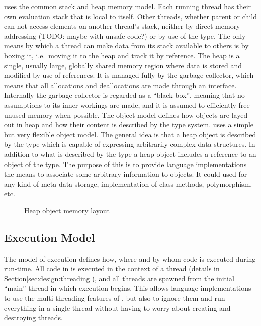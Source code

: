\thename{} uses the common stack and heap memory model. Each running thread has
their own evaluation stack that is local to itself. Other threads, whether
parent or child can not access elements on another thread's stack, neither by
direct memory addressing (TODO: maybe with unsafe code?) or by use of the
 type. The only means by which a thread can make data from
its stack available to others is by boxing it, i.e.~moving it to the heap and
track it by reference. The heap is a single, usually large, globally shared
memory region where data is stored and modified by use of references. It is
managed fully by the garbage collector, which means that all allocations and
deallocations are made through an interface. Internally the garbage collector is
regarded as a ``black box'', meaning that no assumptions to its inner workings
are made, and it is assumed to efficiently free unused memory when possible.
The object model defines how objects are layed out in heap and how their content
is described by the type system. \thename{} uses a simple but very flexible
object model. The general idea is that a heap object is described by the
 type which is capable of expressing arbitrarily complex data
structures. In addition to what is described by the type a heap object includes
a reference to an object of the  type. The purpose of this is to
provide language implementations the means to associate some arbitrary
information to objects. It could used for any kind of meta data storage,
implementation of class methods, polymorphism, etc.

\begin{figure}[H]
  \centering
  
  \caption{Heap object memory layout}
  \label{fig:design:heap-object-layout}
\end{figure}

\subsection{Execution Model}

The model of execution defines how, where and by whom code is executed during
run-time. All code in \thename{} is executed in the context of a thread (details
in Section\ref{sec:design:threading}), and all threads are spawned from the
initial ``main'' thread in which execution begins. This allows language
implementations to use the multi-threading features of \thename{}, but also to
ignore them and run everything in a single thread without having to worry about
creating and destroying threads.

